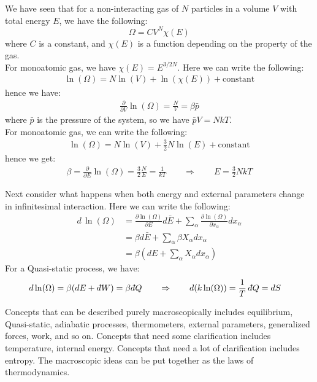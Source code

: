 \documentclass[11pt,oneside]{book}
\theoremstyle{break}
\theoremstyle{break}
\newcommand{\dbar}{d\hspace*{-0.08em}\bar{}\hspace*{0.1em}}
\begin{document}
We have seen that for a non-interacting gas of $N$ particles in a volume $V$ with total energy $E$, we have the following:
$$\Omega = C V^N \chi (E)$$
where $C$ is a constant, and $\chi (E)$ is a function depending on the property of the gas. \\
For monoatomic gas, we have $\chi(E) = E^{3/2 N}$. Here we can write the following:
\begin{align*}
\ln (\Omega) = N\ln (V) + \ln (\chi(E)) + \text{constant}
\end{align*}
hence we have:
\begin{align*}
\frac{\partial}{\partial V}\ln(\Omega) = \frac{N}{V} = \beta \bar{p}
\end{align*}
where $\bar{p}$ is the pressure of the system, so we have $\bar{p}V = NkT$. \\

For monoatomic gas, we can write the following:
\begin{align*}
\ln(\Omega) = N\ln(V) + \frac{3}{2}N \ln(E) + \text{constant}
\end{align*}
hence we get:
\begin{align*}
\beta = \frac{\partial}{\partial E}\ln(\Omega) = \frac{3}{2}\frac{N}{E} = \frac{1}{kT} \qquad \Rightarrow\qquad E = \frac{3}{2}NkT
\end{align*}


Next consider what happens when both energy and external parameters change in infinitesimal interaction. Here we can write the following:
\begin{align*}
d\,\ln(\Omega)&= \frac{\partial \ln(\Omega)}{\partial E} d\bar{E} + \sum_{\alpha} \frac{\partial \ln(\Omega)}{\partial x_{\alpha}}dx_{\alpha}\\
&= \beta d\bar{E} + \sum_{\alpha} \beta X_{\alpha} dx_{\alpha}\\
&= \beta (dE + \sum_{\alpha} X_{\alpha}dx_{\alpha})
\end{align*}
For a Quasi-static process, we have:
\begin{align*}
d \ln (\Omega)&= \beta(dE + \dbar W) = \beta \dbar Q \qquad \Rightarrow \qquad d(k\ln(\Omega)) = \frac{1}{T}\, \dbar Q = dS
\end{align*}


Concepts that can be described purely macroscopically includes equilibrium, Quasi-static, adiabatic processes, thermometers, external parameters, generalized forces, work, and so on. Concepts that need some clarification includes temperature, internal energy. Concepts that need a lot of clarification includes entropy. The macroscopic ideas can be put together as the laws of thermodynamics.\\
\end{document}
